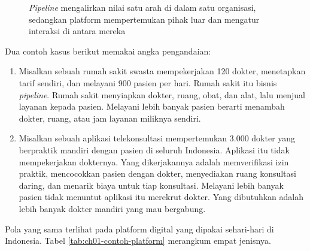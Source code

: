 \begin{figure}[!htb]
  \centering
  
  \caption{\textit{Pipeline} mengalirkan nilai satu arah di dalam satu
           organisasi, sedangkan platform mempertemukan pihak luar dan mengatur
           interaksi di antara mereka}
  \label{fig:ch01-pipeline-platform}
\end{figure}

Dua contoh kasus berikut memakai angka pengandaian:

\begin{enumerate}
  \item Misalkan sebuah rumah sakit swasta mempekerjakan 120 dokter, menetapkan
        tarif sendiri, dan melayani 900 pasien per hari. Rumah sakit itu bisnis
        \textit{pipeline}. Rumah sakit menyiapkan dokter, ruang, obat, dan alat,
        lalu menjual layanan kepada pasien. Melayani lebih banyak pasien berarti
        menambah dokter, ruang, atau jam layanan miliknya sendiri.
  \item Misalkan sebuah aplikasi telekonsultasi mempertemukan 3.000 dokter yang
        berpraktik mandiri dengan pasien di seluruh Indonesia. Aplikasi itu tidak
        mempekerjakan dokternya. Yang dikerjakannya adalah memverifikasi izin
        praktik, mencocokkan pasien dengan dokter, menyediakan ruang konsultasi
        daring, dan menarik biaya untuk tiap konsultasi. Melayani lebih banyak
        pasien tidak menuntut aplikasi itu merekrut dokter. Yang dibutuhkan
        adalah lebih banyak dokter mandiri yang mau bergabung.
\end{enumerate}

Pola yang sama terlihat pada platform digital yang dipakai sehari-hari di
Indonesia. Tabel \ref{tab:ch01-contoh-platform} merangkum empat jenisnya.

